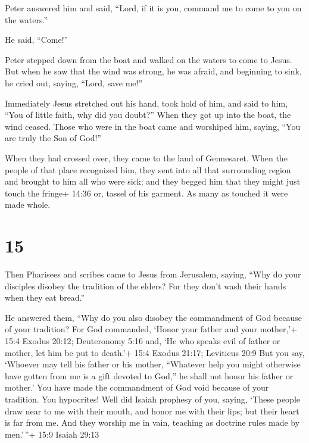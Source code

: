  Peter answered him and said, ``Lord, if it is you, command
me to come to you on the waters.''

 He said, ``Come!''

Peter stepped down from the boat and walked on the waters to come to
Jesus.  But when he saw that the wind was strong, he was
afraid, and beginning to sink, he cried out, saying, ``Lord, save me!''

 Immediately Jesus stretched out his hand, took hold of
him, and said to him, ``You of little faith, why did you doubt?''
 When they got up into the boat, the wind ceased.
 Those who were in the boat came and worshiped him, saying,
``You are truly the Son of God!''

 When they had crossed over, they came to the land of
Gennesaret.  When the people of that place recognized him,
they sent into all that surrounding region and brought to him all who
were sick;  and they begged him that they might just touch
the fringe+ 14:36 or, tassel of his garment. As many as touched it were
made whole.

\hypertarget{section-14}{%
\section{15}\label{section-14}}

 Then Pharisees and scribes came to Jesus from Jerusalem,
saying,  ``Why do your disciples disobey the tradition of
the elders? For they don't wash their hands when they eat bread.''

 He answered them, ``Why do you also disobey the commandment
of God because of your tradition?  For God commanded, `Honor
your father and your mother,'+ 15:4 Exodus 20:12; Deuteronomy 5:16 and,
`He who speaks evil of father or mother, let him be put to death.'+ 15:4
Exodus 21:17; Leviticus 20:9  But you say, `Whoever may tell
his father or his mother, ``Whatever help you might otherwise have
gotten from me is a gift devoted to God,''  he shall not
honor his father or mother.' You have made the commandment of God void
because of your tradition.  You hypocrites! Well did Isaiah
prophesy of you, saying,  `These people draw near to me with
their mouth, and honor me with their lips; but their heart is far from
me.  And they worship me in vain, teaching as doctrine rules
made by men.'\,''+ 15:9 Isaiah 29:13

